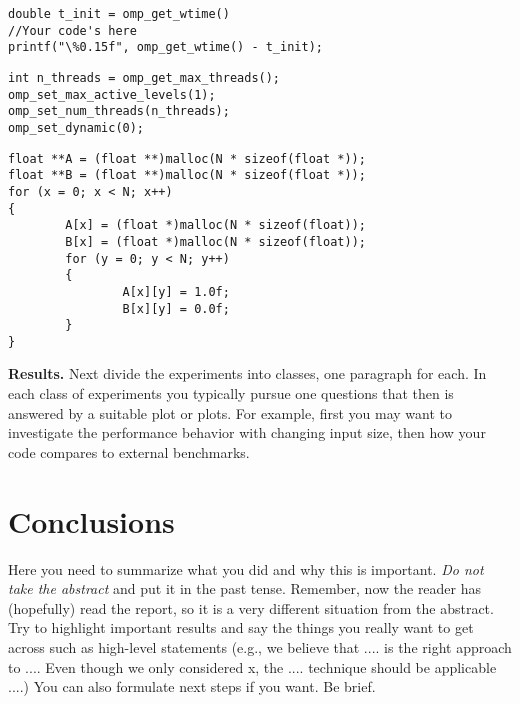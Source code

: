 \documentclass[conference]{IEEEtran}
\newcommand{\mypar}[1]{{\bf #1.}}
\begin{document}
\renewcommand{\lstlistingname}{Algorithm}

\begin{lstlisting}[caption={An example of code for obtaining execution time},label={lst:omp-get-time-alg}]
double t_init = omp_get_wtime()
//Your code's here
printf("\%0.15f", omp_get_wtime() - t_init);
\end{lstlisting}

\begin{lstlisting}[caption={OpenMP Configs},label={lst:omp-configs-alg}]
int n_threads = omp_get_max_threads();
omp_set_max_active_levels(1);
omp_set_num_threads(n_threads);
omp_set_dynamic(0);
\end{lstlisting}

\begin{lstlisting}[caption={A and B matrices initialization},label={lst:initialization-alg}]
float **A = (float **)malloc(N * sizeof(float *));
float **B = (float **)malloc(N * sizeof(float *));
for (x = 0; x < N; x++)
{
		A[x] = (float *)malloc(N * sizeof(float));
		B[x] = (float *)malloc(N * sizeof(float));
		for (y = 0; y < N; y++)
		{
				A[x][y] = 1.0f;
				B[x][y] = 0.0f;
		}
}
\end{lstlisting}

\mypar{Results}
Next divide the experiments into classes, one paragraph for each. In each class of experiments you typically pursue one questions that then is answered by a suitable plot or plots. For example, first you may want to investigate the performance behavior with changing input size, then how your code compares to external benchmarks.

\section{Conclusions}

Here you need to summarize what you did and why this is
important. {\em Do not take the abstract} and put it in the past
tense. Remember, now the reader has (hopefully) read the report, so it
is a very different situation from the abstract. Try to highlight
important results and say the things you really want to get across
such as high-level statements (e.g., we believe that .... is the right
approach to .... Even though we only considered x, the
.... technique should be applicable ....) You can also formulate next
steps if you want. Be brief. 
\end{document}
